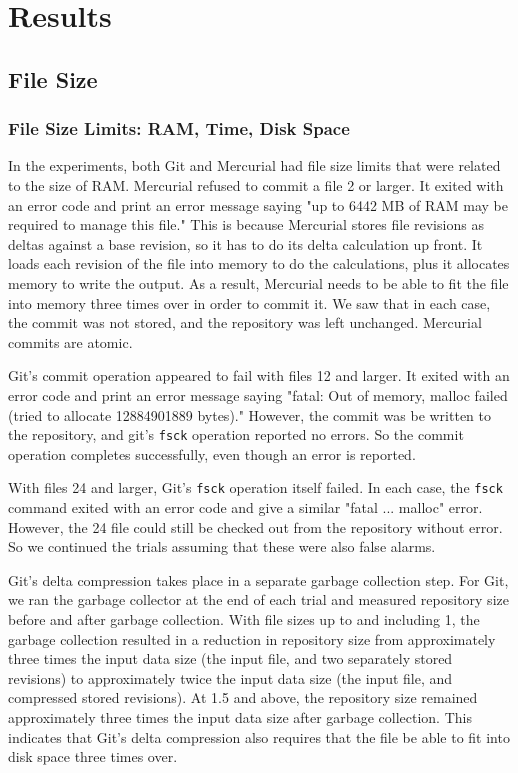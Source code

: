 \section{Results}

\subsection{File Size}

\subsubsection{File Size Limits: RAM, Time, Disk Space}

In the experiments, both Git and Mercurial had file size limits that were related to the size of RAM.
Mercurial refused to commit a file \SI{2}{\gib} or larger.
It exited with an error code and print an error message saying "up to 6442 MB of RAM may be required to manage this file."
This is because Mercurial stores file revisions as deltas against a base revision, so it has to do its delta calculation up front.
It loads each revision of the file into memory to do the calculations, plus it allocates memory to write the output.
As a result, Mercurial needs to be able to fit the file into memory three times over in order to commit it.
We saw that in each case, the commit was not stored, and the repository was left unchanged.
Mercurial commits are atomic.

Git's commit operation appeared to fail with files \SI{12}{\gib} and larger.
It exited with an error code and print an error message saying "fatal: Out of memory, malloc failed (tried to allocate 12884901889 bytes)."
However, the commit was be written to the repository, and git's \lstinline{fsck} operation reported no errors.
So the commit operation completes successfully, even though an error is reported.

With files \SI{24}{\gib} and larger, Git's \lstinline{fsck} operation itself failed.
In each case, the \lstinline{fsck} command exited with an error code and give a similar "fatal ... malloc" error.
However, the \SI{24}{\gib} file could still be checked out from the repository without error.
So we continued the trials assuming that these were also false alarms.

Git's delta compression takes place in a separate garbage collection step.
For Git, we ran the garbage collector at the end of each trial and measured repository size before and after garbage collection.
With file sizes up to and including \SI{1}{\gib}, the garbage collection resulted in a reduction in repository size from approximately three times the input data size (the input file, and two separately stored revisions) to approximately twice the input data size (the input file, and compressed stored revisions).
At \SI{1.5}{\gib} and above, the repository size remained approximately three times the input data size after garbage collection.
This indicates that Git's delta compression also requires that the file be able to fit into disk space three times over.

